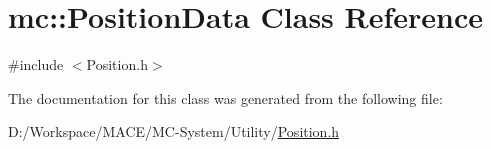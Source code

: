 \hypertarget{classmc_1_1_position_data}{}\section{mc\+:\+:Position\+Data Class Reference}
\label{classmc_1_1_position_data}


{\ttfamily \#include $<$Position.\+h$>$}



The documentation for this class was generated from the following file\+:\begin{DoxyCompactItemize}
\item 
D\+:/\+Workspace/\+M\+A\+C\+E/\+M\+C-\/\+System/\+Utility/\hyperlink{_position_8h}{Position.\+h}\end{DoxyCompactItemize}
